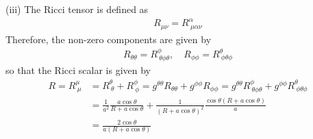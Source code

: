 \documentclass[12pt]{article}
\begin{document}
(iii)
The Ricci tensor is defined as
\begin{align}
R_{\mu \nu} = R^{\alpha}_{~\mu \alpha \nu}
\end{align}
Therefore, the non-zero components are given by
\begin{align}
R_{\theta \theta} = R^{\phi}_{~\theta \phi \theta}, \quad R_{\phi \phi} = R^{\theta}_{~\phi \theta \phi}
\end{align}
so that the Ricci scalar is given by
\begin{align}
R = R^{\mu}_{~\mu} &= R^{\theta}_{~\theta} + R^{\phi}_{~\phi} = g^{\theta \theta} R_{\theta \theta} + g^{\phi \phi} R_{\phi \phi} = g^{\theta \theta} R^{\phi}_{~\theta \phi \theta} + g^{\phi \phi} R^{\theta}_{~\phi \theta \phi}\\
&= \frac{1}{a^2} \frac{a \cos{\theta}}{R + a \cos{\theta}}  + \frac{1}{\left( R + a \cos{\theta}\right)^{2}} \frac{\cos{\theta} \left( R + a \cos{\theta}\right)}{a} \nonumber \\
&= \frac{2 \cos{\theta}}{a \left(R + a \cos{\theta}\right)}
\end{align}
\end{document}
